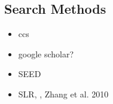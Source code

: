 \subsection{Search Methods}

\begin{itemize}
	\item ccs
	\item google scholar?
	\item SEED
	\item SLR, , Zhang et al. 2010
\end{itemize}